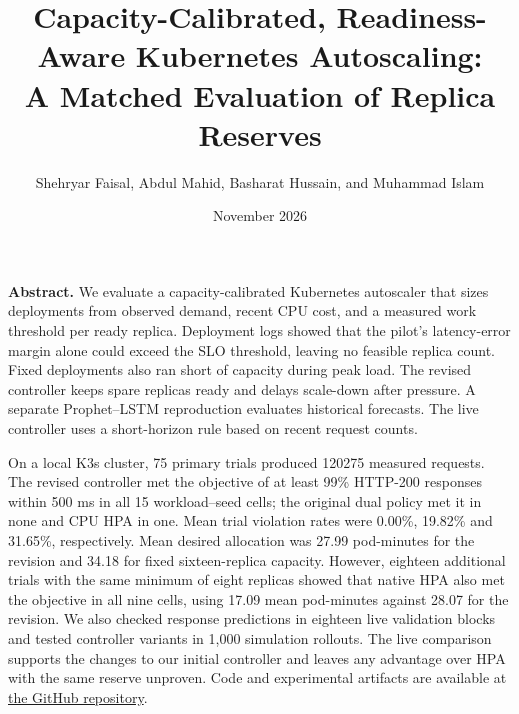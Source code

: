 \documentclass[10pt,twocolumn,a4paper]{article}
\title{Capacity-Calibrated, Readiness-Aware Kubernetes Autoscaling:\\A Matched Evaluation of Replica Reserves}
\author{Shehryar Faisal, Abdul Mahid, Basharat Hussain, and Muhammad Islam}
\date{November 2026}
\begin{document}
\maketitle
\begingroup
\makeatletter\let\@makefnmark\@empty\makeatother
{}
\endgroup
\noindent\textbf{Abstract.}\quad
We evaluate a capacity-calibrated Kubernetes autoscaler that sizes deployments from observed demand, recent CPU cost, and a measured work threshold per ready replica. Deployment logs showed that the pilot's latency-error margin alone could exceed the SLO threshold, leaving no feasible replica count. Fixed deployments also ran short of capacity during peak load. The revised controller keeps spare replicas ready and delays scale-down after pressure. A separate Prophet--LSTM reproduction evaluates historical forecasts. The live controller uses a short-horizon rule based on recent request counts.

On a local K3s cluster, 75 primary trials produced 120275 measured requests. The revised controller met the objective of at least 99\% HTTP-200 responses within 500 ms in all 15 workload--seed cells; the original dual policy met it in none and CPU HPA in one. Mean trial violation rates were 0.00\%, 19.82\% and 31.65\%, respectively. Mean desired allocation was 27.99 pod-minutes for the revision and 34.18 for fixed sixteen-replica capacity. However, eighteen additional trials with the same minimum of eight replicas showed that native HPA also met the objective in all nine cells, using 17.09 mean pod-minutes against 28.07 for the revision. We also checked response predictions in eighteen live validation blocks and tested controller variants in 1,000 simulation rollouts. The live comparison supports the changes to our initial controller and leaves any advantage over HPA with the same reserve unproven. Code and experimental artifacts are available at \href{https://github.com/shehryarf67/uncertainty-aware-digital-twin-k8s-autoscaling}{the GitHub repository}.
\end{document}

